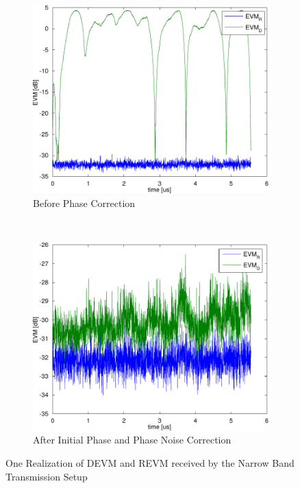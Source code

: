 \begin{figure}[p]
  \centering
  \begin{subfigure}{0.45\textwidth}
    \centering
    \includegraphics[width=\textwidth]{figures/matlab/res_450_qam4_evm}
    \caption{Before Phase Correction}
    \label{fig:res_450_qam4_evm}
  \end{subfigure}
  ~
  \begin{subfigure}{0.45\textwidth}
    \centering
    \includegraphics[width=\textwidth]{figures/matlab/res_450_qam4_evm_pcorr_initial}
    \caption{After Initial Phase and Phase Noise Correction}
    \label{fig:res_450_qam4_evm_pcorr_initial}
  \end{subfigure}
  \caption{One Realization of \gls{DEVM} and \gls{REVM}
    received by the Narrow Band Transmission Setup}
  \label{fig:res_450_qam4_evm_comparison}
\end{figure}

